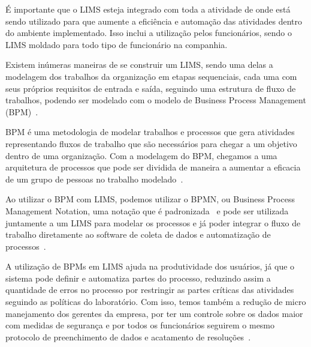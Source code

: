 
É importante que o LIMS esteja integrado com toda a atividade de onde está sendo utilizado para que aumente a eficiência e automação das atividades dentro do ambiente implementado. Isso inclui a utilização pelos funcionários, sendo o LIMS moldado para todo tipo de funcionário na companhia.

Existem inúmeras maneiras de se construir um LIMS, sendo uma delas a modelagem dos trabalhos da organização em etapas sequenciais, cada uma com seus próprios requisitos de entrada e saída, seguindo uma estrutura de fluxo de trabalhos, podendo ser modelado com o modelo de Business Process Management (BPM)~\cite{Holzmuller-Laue2014ImprovedAutomation}.

BPM é uma metodologia de modelar trabalhos e processos que gera atividades representando fluxos de trabalho que são necessários para chegar a um objetivo dentro de uma organização. Com a modelagem do BPM, chegamos a uma arquitetura de processos que pode ser dividida de maneira a aumentar a eficacia de um grupo de pessoas no trabalho modelado~\cite{Hammer2015WhatManagement}.


Ao utilizar o BPM com LIMS, podemos utilizar o BPMN, ou Business Process Management Notation, uma notação que é padronizada~\cite{Chinosi2012BPMN:Standard} e pode ser utilizada juntamente a um LIMS para modelar os processos e já poder integrar o fluxo de trabalho diretamente ao software de coleta de dados e automatização de processos~\cite{Holzmuller-Laue2013AAutomation}.


A utilização de BPMs em LIMS ajuda na produtividade dos usuários, já que o sistema pode definir e automatiza partes do processo, reduzindo assim a quantidade de erros no processo por restringir as partes críticas das atividades seguindo as políticas do laboratório.
Com isso, temos também a redução de micro manejamento dos gerentes da empresa, por ter um controle sobre os dados maior com medidas de segurança e por todos os funcionários seguirem o mesmo protocolo de preenchimento de dados e acatamento de resoluções~\cite{BenefitsManagement}.


